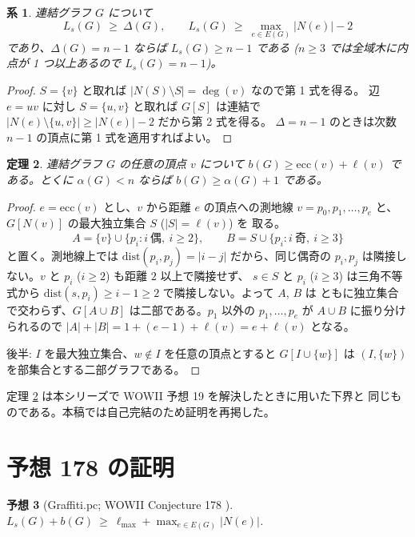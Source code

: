 \documentclass[paper=a4,fontsize=10.5pt,jafontsize=10.5pt]{jlreq}
\theoremstyle{plain}
\newtheorem{theorem}{定理}[section]
\newtheorem{corollary}[theorem]{系}
\newtheorem{conjecture}[theorem]{予想}
\theoremstyle{definition}
\begin{document}
\begin{corollary}\label{cor:sub}
連結グラフ $G$ について
\[ L_s(G) \ \ge \ \Delta(G), \qquad
   L_s(G) \ \ge \ \max_{e \in E(G)} |N(e)| - 2 \]
であり、$\Delta(G) = n - 1$ ならば $L_s(G) \ge n - 1$ である
($n \ge 3$ では全域木に内点が 1 つ以上あるので $L_s(G) = n - 1$)。
\end{corollary}

\begin{proof}
$S = \{v\}$ と取れば $|N(S) \setminus S| = \deg(v)$ なので第 1 式を得る。
辺 $e = uv$ に対し $S = \{u, v\}$ と取れば $G[S]$ は連結で
$|N(e) \setminus \{u,v\}| \ge |N(e)| - 2$ だから第 2 式を得る。
$\Delta = n-1$ のときは次数 $n-1$ の頂点に第 1 式を適用すればよい。
\end{proof}

\begin{theorem}\label{thm:becc}
連結グラフ $G$ の任意の頂点 $v$ について
$b(G) \ge \mathrm{ecc}(v) + \ell(v)$ である。とくに $\alpha(G) < n$ ならば
$b(G) \ge \alpha(G) + 1$ である。
\end{theorem}

\begin{proof}
$e = \mathrm{ecc}(v)$ とし、$v$ から距離 $e$ の頂点への測地線
$v = p_0, p_1, \dots, p_e$ と、$G[N(v)]$ の最大独立集合 $S$ ($|S| = \ell(v)$) を
取る。
\[ A = \{v\} \cup \{p_i : i \ \text{偶},\ i \ge 2\}, \qquad
   B = S \cup \{p_i : i \ \text{奇},\ i \ge 3\} \]
と置く。測地線上では $\mathrm{dist}(p_i, p_j) = |i - j|$ だから、同じ偶奇の
$p_i, p_j$ は隣接しない。$v$ と $p_i$ ($i \ge 2$) も距離 $2$ 以上で隣接せず、
$s \in S$ と $p_i$ ($i \ge 3$) は三角不等式から
$\mathrm{dist}(s, p_i) \ge i - 1 \ge 2$ で隣接しない。よって $A$, $B$ は
ともに独立集合で交わらず、$G[A \cup B]$ は二部である。$p_1$ 以外の
$p_1, \dots, p_e$ が $A \cup B$ に振り分けられるので
$|A| + |B| = 1 + (e-1) + \ell(v) = e + \ell(v)$ となる。

後半: $I$ を最大独立集合、$w \notin I$ を任意の頂点とすると
$G[I \cup \{w\}]$ は $(I, \{w\})$ を部集合とする二部グラフである。
\end{proof}

定理 \ref{thm:becc} は本シリーズで WOWII 予想 19 を解決したときに用いた下界と
同じものである。本稿では自己完結のため証明を再掲した。

\section{予想 178 の証明}\label{sec:178}

\begin{conjecture}[Graffiti.pc; WOWII Conjecture 178 \cite{wowii}]
\label{conj:178}
$L_s(G) + b(G) \ \ge \ \ell_{\max} + \max_{e \in E(G)} |N(e)|$.
\end{conjecture}
\end{document}

